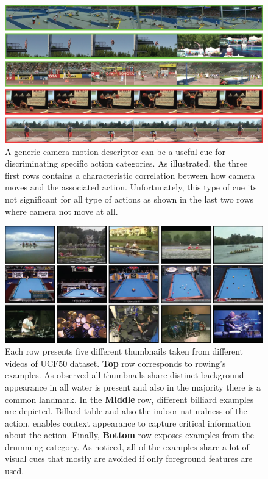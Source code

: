 \begin{figure}[t!]
\begin{center}
\includegraphics[width=0.98\linewidth]{fig/camMotion.png}
\end{center}
\caption{A generic camera motion descriptor can be a useful cue for discriminating specific action categories. As illustrated, the three first rows contains a characteristic correlation between how camera moves and the associated action. Unfortunately, this type of cue its not significant for all type of actions as shown in the last two rows where camera not move at all.}
\label{fig:camMotion_example}
\end{figure}

\begin{figure}[t!]
\begin{center}
\includegraphics[width=0.98\linewidth]{fig/sift.png}
\end{center}
\caption{Each row presents five different thumbnails taken from different videos of UCF50 dataset. \textbf{Top} row corresponds to rowing's examples. As observed all thumbnails share distinct background appearance \ie in all water is present and also in the majority there is a common landmark. In the \textbf{Middle} row, different billiard examples are depicted. Billard table and also the indoor naturalness of the action, enables context appearance to capture critical information about the action. Finally, \textbf{Bottom} row exposes examples from the drumming category. As noticed, all of the examples share a lot of visual cues that mostly are avoided if only foreground features are used.}
\label{fig:sift_example}
\end{figure}




